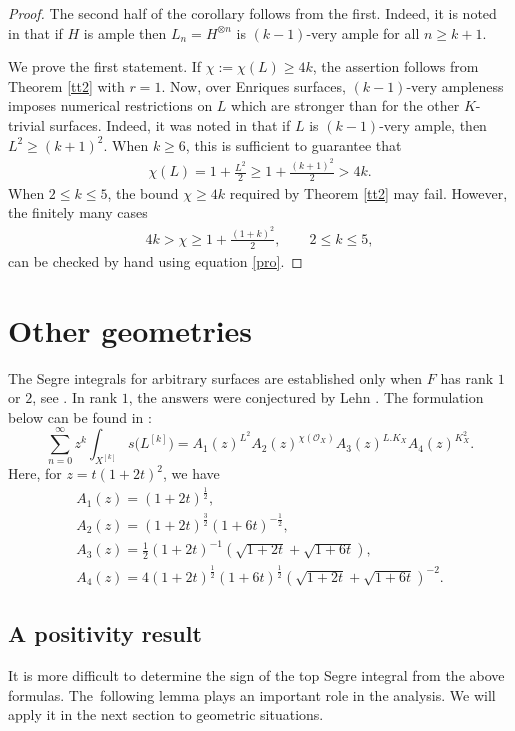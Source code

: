 \documentclass[pdftex]{sigma}
\numberwithin{equation}{section}
\begin{document}
\begin{proof} The second half of the corollary follows from the first. Indeed, it is noted in \cite[Proposition $2.5$]{S} that if $H$ is ample then $L_n=H^{\otimes n}$ is $(k-1)$-very ample for all $n\geq k+1$.

We prove the first statement. If $\chi:=\chi(L)\geq 4k$, the assertion follows from Theorem \ref{tt2} with $r=1$. Now, over Enriques surfaces, $(k-1)$-very ampleness imposes numerical restrictions on $L$ which are stronger than for the other $K$-trivial surfaces. Indeed, it was noted in \cite[Theorem~2.4]{S} that if $L$ is $(k-1)$-very ample, then $L^2\geq (k+1)^2$.
When $k\geq 6$, this is sufficient to guarantee that
\begin{gather*}
\chi(L)=1+\frac{L^2}{2}\geq 1+\frac{(k+1)^2}{2}>4k.
\end{gather*}
When $2\leq k\leq 5$, the bound $\chi\geq 4k$ required by Theorem \ref{tt2} may fail. However, the finitely many cases
\begin{gather*}
4k>\chi\geq 1+ \frac{(1+k)^2}{2}, \qquad 2\leq k\leq 5,
\end{gather*}
can be checked by hand using equation \eqref{pro}.
\end{proof}

\section{Other geometries} \label{secother}
The Segre integrals for arbitrary surfaces are established only when $F$ has rank $1$ or $2$, see \cite{MOP1, MOP}. In rank $1$, the answers were conjectured by Lehn \cite{Le}. The formulation below can be found in \cite{MOP}:
\begin{equation}\label{lehnc}
\sum_{n=0}^{\infty} z^k \int_{X^{[k]}} s\big(L^{[k]}\big) = A_1 (z)^{L^2} A_2(z)^{\chi(\mathcal O_X)} A_3 (z)^{L.K_X} A_4(z)^{K_X^2}.
\end{equation}
Here, for $z=t(1+2t)^2$, we have
\begin{gather*}
A_1(z)=(1+2t)^{\frac{1}{2}},
\\
A_2(z)=(1+2t)^{\frac{3}{2}} (1+6t)^{-\frac{1}{2}},
\\
A_3(z)=\frac{1}{2} (1+2t)^{-1} \left(\sqrt{1+2t}+\sqrt{1+6t}\right),
\\
 A_4(z)=4 (1+2t)^{\frac{1}{2}} (1+6t)^{\frac{1}{2}} \left(\sqrt{1+2t}+\sqrt{1+6t}\right)^{-2}.
 \end{gather*}

\subsection{A positivity result} It is more difficult to determine the sign of the top Segre integral from the above formulas. The~following lemma plays an important role in the analysis. We will apply it in the next section to geometric situations.
\end{document}
